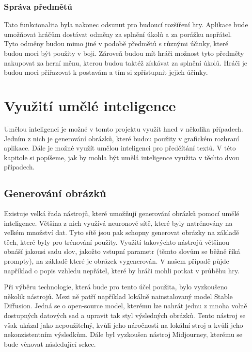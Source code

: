 \subsubsection*{Správa předmětů}
Tato funkcionalita byla nakonec odsunut pro budoucí rozšíření hry. Aplikace bude umožňovat hráčům dostávat odměny za splnění úkolů a za porážku nepřátel. Tyto odměny budou mimo jiné v podobě předmětů s různými účinky, které budou moci být použity v boji. Zároveň budou mít hráči možnost tyto předměty nakupovat za herní měnu, kterou budou taktéž získávat za splnění úkolů. Hráči je budou moci přiřazovat k postavám a tím si zpřístupnit jejich účinky.

\section{Využití umělé inteligence}
Umělou inteligenci je možné v tomto projektu využít hned v několika případech. Jedním z nich je generování obrázků, které budou použity v grafickém rozhraní aplikace. Dále je možné využít umělou inteligenci pro předčítání textů. V této kapitole si popíšeme, jak by mohla být umělá inteligence využita v těchto dvou případech.

\subsection{Generování obrázků}\label{sec:generovani_obrazku}
Existuje velká řada nástrojů, které umožňují generování obrázků pomocí umělé inteligence. Většina z nich využívá neuronové sítě, které byly natrénovány na velkém množství dat. Tyto sítě jsou pak schopny generovat obrázky na základě těch, které byly pro trénování použity. Využití takovýchto nástrojů většinou obnáší jakousi sadu slov, jakožto vstupní parametr (těmto slovům se běžně říká prompty), na základě které je obrázek vygenerován. V našem případě půjde například o popis vzhledu nepřátel, které by hráči mohli potkat v průběhu hry.

Při výběru technologie, která bude pro tento účel použita, bylo vyzkoušeno několik nástrojů. Mezi ně patří například lokálně nainstalovaný model Stable Diffusion\cite{stability_ai}. Jedná se o open-source model, kterému lze nahrát jednu z mnoha volně dostupných datových sad a upravit tak styl výsledných obrázků. Tento nástroj se však ukázal jako nepoužitelný, kvůli jeho náročnosti na lokální stroj a kvůli jeho nekonzistentním výsledkům. Dále byl vyzkoušen nástroj Midjourney\cite*{midjourney}, kterému se bude věnovat následující sekce.


